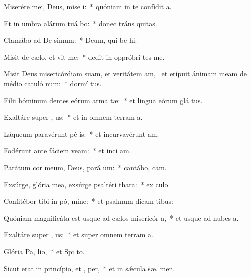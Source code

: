 \item Miserére mei, Deus, mise i:~* quóniam in te confídit  a.
\item Et in umbra alárum tuá bo:~* donec tráns quitas.
\item Clamábo ad De simum:~* Deum, qui be hi.
\item Misit de cælo, et vit me:~* dedit in oppróbri tes me.
\item Misit Deus misericórdiam suam, et veritátem am,~\pscross{} et erípuit ánimam meam de médio catuló num:~* dormí tus.
\item Fílii hóminum dentes eórum arma  tæ:~* et lingua eórum glá tus.
\item Exaltáre super , us:~* et in omnem terram  a.
\item Láqueum paravérunt pé is:~* et incurvavérunt  am.
\item Fodérunt ante fáciem  veam:~* et inci  am.
\item Parátum cor meum, Deus, pará  um:~* cantábo,   cam.
\item Exsúrge, glória mea, exsúrge psaltéri  thara:~* ex culo.
\item Confitébor tibi in pó, mine:~* et psalmum dicam   tibus:
\item Quóniam magnificáta est usque ad cælos misericór a,~* et usque ad nubes  a.
\item Exaltáre super , us:~* et super omnem terram  a.
\item Glória Pa,  lio,~* et Spi to.
\item Sicut erat in princípio, et ,  per,~* et in sǽcula sæ. men.

